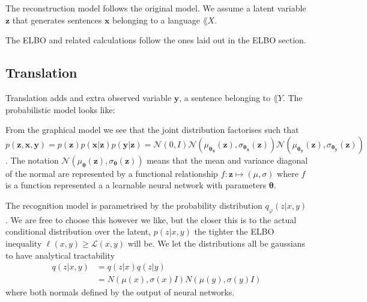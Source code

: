 The reconstruction model follows the original model. We assume a latent variable
$\bm{z}$ that generates sentences $\bm{x}$ belonging to a language $\lang{X}$.

The ELBO and related calculations follow the ones laid out in the ELBO section.

\subsection{Translation}

Translation adds and extra observed variable $\bm{y}$, a sentence belonging to
$\lang{Y}$. The probabilistic model looks like:

\begin{figure}[H]
  \center
\end{figure}

From the graphical model we see that the joint distribution factorises such that
\begin{equation}
  \label{eq:joint_generative}
  p(\bm{\bm{z}}, \bm{x}, \bm{y}) = p(\bm{z})p(\bm{x} | \bm{z})p(\bm{y} | \bm{z}) = \mathcal{N}(0, I)\mathcal{N}(\mu_{\bm{\theta}_{\bm{x}}}(\bm{z}), \sigma_{\bm{\theta}_{\bm{x}}}(\bm{z}))\mathcal{N}(\mu_{\bm{\theta}_{\bm{y}}}(\bm{z}), \sigma_{\bm{\theta}_{\bm{y}}}(\bm{z}))
\end{equation}.
The notation $\mathcal{N}(\mu_{\bm{\theta}}(\bm{z}), \sigma_{\bm{\theta}}(\bm{z}))$
means that the mean and variance diagonal of the normal are represented by a
functional relationship $f: \bm{z} \mapsto (\mu, \sigma)$ where $f$ is a function
represented a a learnable neural network with parameters $\bm{\theta}$.

The recognition model is parametrised by the probability distribution
$q_{\varphi}(z | x, y)$. We are free to choose this however we like, but the closer
this is to the actual conditional distribution over the latent, $p(z | x, y)$
the tighter the ELBO inequality $\ell(x, y) \geq \mathcal{L}(x, y)$ will be. We
let the distributions all be gaussians to have analytical tractability
\begin{align*}
  q(z | x, y) & = q(z | x)q(z | y) \\
              & = N(\mu(x), \sigma(x) I) N(\mu(y), \sigma(y) I)
\end{align*}
where both normals defined by the output of neural networks.

